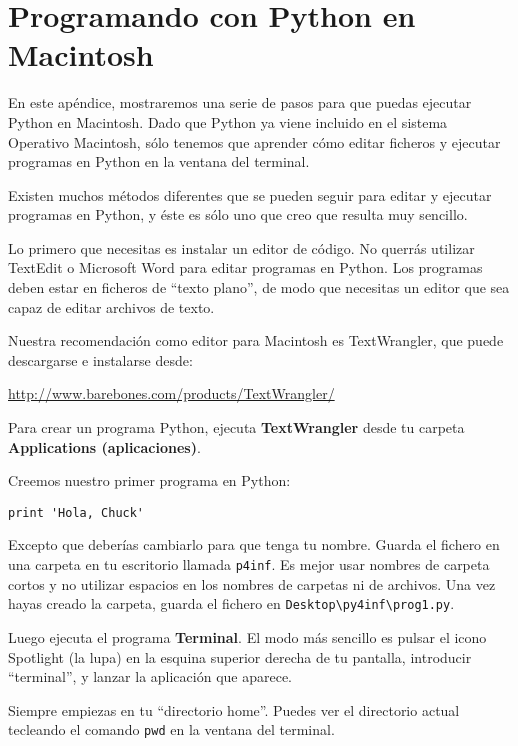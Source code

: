 
\chapter{Programando con Python en Macintosh}

En este apéndice, mostraremos una serie de pasos
para que puedas ejecutar Python en Macintosh. Dado que Python
ya viene incluido en el sistema Operativo Macintosh, sólo
tenemos que aprender cómo editar ficheros y ejecutar programas
en Python en la ventana del terminal.

Existen muchos métodos diferentes que se pueden seguir para editar y ejecutar
programas en Python, y éste es sólo uno que creo que
resulta muy sencillo.

Lo primero que necesitas es instalar un editor de código. No
querrás utilizar TextEdit o Microsoft Word para editar
programas en Python. Los programas deben estar en ficheros de ``texto plano'',
de modo que necesitas un editor que sea capaz de
editar archivos de texto.

Nuestra recomendación como editor para Macintosh es TextWrangler, que
puede descargarse e instalarse desde:

\url{http://www.barebones.com/products/TextWrangler/}

Para crear un programa Python, ejecuta
{\bf TextWrangler} desde tu carpeta {\bf Applications (aplicaciones)}.

Creemos nuestro primer programa en Python:

\beforeverb
\begin{verbatim}
print 'Hola, Chuck'
\end{verbatim}
\afterverb
%
Excepto que deberías cambiarlo para que tenga tu nombre.
Guarda el fichero en una carpeta en tu escritorio llamada
{\tt p4inf}. Es mejor usar nombres de carpeta cortos
y no utilizar espacios en los nombres de carpetas ni de archivos.
Una vez hayas creado la carpeta, guarda el fichero
en {\tt Desktop{\textbackslash}py4inf{\textbackslash}prog1.py}.

Luego ejecuta el programa {\bf Terminal}. El modo más sencillo es
pulsar el icono Spotlight (la lupa) en la esquina superior
derecha de tu pantalla, introducir ``terminal'', y lanzar la
aplicación que aparece.

Siempre empiezas en tu ``directorio home''. Puedes ver el directorio
actual tecleando el comando {\tt pwd} en la ventana del terminal.

